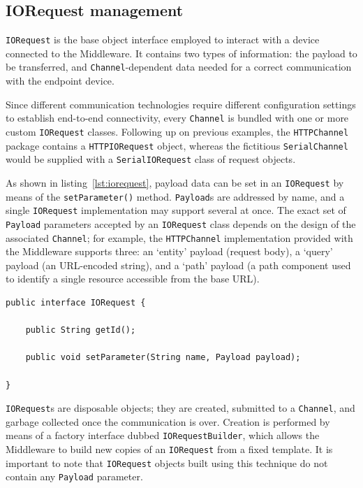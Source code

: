 \subsection{IORequest management}

\texttt{IORequest} is the base object interface employed to interact with a device connected to the Middleware. It contains two types of information: the payload to be transferred, and \texttt{Channel}-dependent data needed for a correct communication with the endpoint device.

Since different communication technologies require different configuration settings to establish end-to-end connectivity, every \texttt{Channel} is bundled with one or more custom \texttt{IORequest} classes. Following up on previous examples, the \texttt{HTTPChannel} package contains a \texttt{HTTPIORequest} object, whereas the fictitious \texttt{SerialChannel} would be supplied with a \texttt{SerialIORequest} class of request objects.

As shown in listing~\ref{lst:iorequest}, payload data can be set in an \texttt{IORequest} by means of the \texttt{setParameter()} method. \texttt{Payload}s are addressed by name, and a single \texttt{IORequest} implementation may support several at once. The exact set of \texttt{Payload} parameters accepted by an \texttt{IORequest} class depends on the design of the associated \texttt{Channel}; for example, the \texttt{HTTPChannel} implementation provided with the Middleware supports three: an `entity' payload (request body), a `query' payload (an URL-encoded string), and a `path' payload (a path component used to identify a single resource accessible from the base URL).

\lstset{language=Java}
\begin{lstlisting}[float,floatplacement=H,caption=The IORequest interface,label={lst:iorequest}]
public interface IORequest {

	public String getId();

	public void setParameter(String name, Payload payload);
	
}
\end{lstlisting}

\texttt{IORequest}s are disposable objects; they are created, submitted to a \texttt{Channel}, and garbage collected once the communication is over. Creation is performed by means of a factory interface dubbed \texttt{IORequestBuilder}, which allows the Middleware to build new copies of an \texttt{IORequest} from a fixed template. It is important to note that \texttt{IORequest} objects built using this technique do not contain any \texttt{Payload} parameter.

